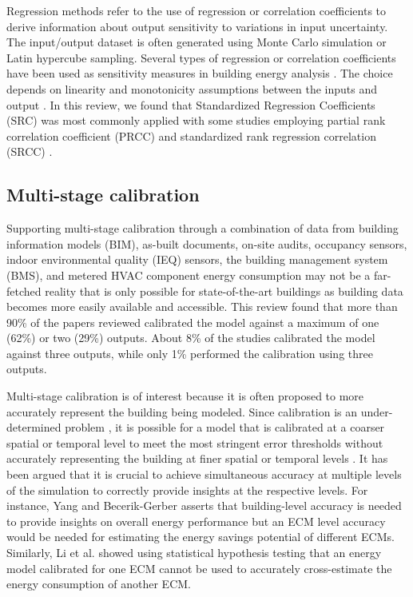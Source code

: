 \documentclass[review]{elsarticle}
\begin{document}
Regression methods refer to the use of regression or correlation coefficients to derive information about output sensitivity to variations in input uncertainty. The input/output dataset is often generated using Monte Carlo simulation or Latin hypercube sampling. Several types of regression or correlation coefficients have been used as sensitivity measures in building energy analysis  \cite{tian2013review}. The choice depends on linearity and monotonicity assumptions between the inputs and output \cite{pianosi2016sensitivity}. In this review, we found that Standardized Regression Coefficients (SRC) was most commonly applied \cite{lim2018influences, qiu2018quick, lim2017comprehensive, tian2016identifying} with some studies employing partial rank correlation coefficient (PRCC) \cite{andrade-cabrera2019augmented} and standardized rank regression correlation (SRCC) \cite{ascione2020real}. 

\subsection{Multi-stage calibration} \label{sec:multi-stage}

Supporting multi-stage calibration through a combination of data from building information models (BIM), as-built documents, on-site audits, occupancy sensors, indoor environmental quality (IEQ) sensors, the building management system (BMS), and metered HVAC component energy consumption may not be a far-fetched reality that is only possible for state-of-the-art buildings as building data becomes more easily available and accessible. This review found that more than 90\% of the papers reviewed calibrated the model against a maximum of one (62\%) or two (29\%) outputs. About 8\% of the studies calibrated the model against three outputs, while only 1\% performed the calibration using three outputs. 

Multi-stage calibration is of interest because it is often proposed to more accurately represent the building being modeled. Since calibration is an under-determined problem \cite{chong2018guidelines}, it is possible for a model that is calibrated at a coarser spatial or temporal level to meet the most stringent error thresholds without accurately representing the building at finer spatial or temporal levels \cite{zuhaib2019application, yin2016linking, raftery2011calibrating}. It has been argued that it is crucial to achieve simultaneous accuracy at multiple levels of the simulation to correctly provide insights at the respective levels. For instance, Yang and Becerik-Gerber \cite{yang2015model} asserts that building-level accuracy is needed to provide insights on overall energy performance but an ECM level accuracy would be needed for estimating the energy savings potential of different ECMs. Similarly, Li et al. \cite{li2015why} showed using statistical hypothesis testing that an energy model calibrated for one ECM cannot be used to accurately cross-estimate the energy consumption of another ECM. 
\end{document}
